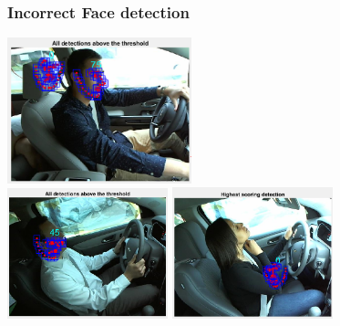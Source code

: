 \documentclass{beamer}
\begin{document}
	\begin{frame}
		\frametitle{Incorrect Face detection}
		\begin{center}
			\includegraphics[width=0.4\textwidth]{faces/face3} \\ \vspace{0.1cm}
			\includegraphics[width=0.35\textwidth]{faces/face5} \hspace{0.1cm}
			\includegraphics[width=0.35\textwidth]{faces/face7}
		\end{center}		
	\end{frame}
	
	
    

	
	
\end{document}
